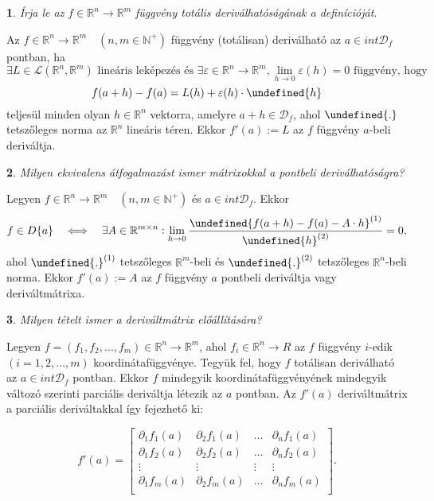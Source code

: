 \documentclass[a4paper]{article}
\def\R{\mathbb{R}}
\def\N{\mathbb{N}}
\theoremstyle{qstyle}
\newtheorem{question}{}{}
\let\norm\undefined %
\DeclarePairedDelimiter\norm{\lVert}{\rVert}
\begin{document}
	\begin{question}
		Írja le az $f \in \R^n \to \R^m$ függvény totális deriválhatóságának a definícióját.
	\end{question}
	Az $f \in \R^n \to \R^m \quad (n,m \in \N^+)$ függvény (totálisan) deriválható az $a\in int\mathcal{D}_f$ pontban, ha
	$$\exists L \in \mathcal{L}(\R^n,\R^m) \text{ lineáris leképezés és } \exists \varepsilon \in \R^n\to\R^m, \lim\limits_{h\to 0} \varepsilon(h) = 0 \text{ függvény, hogy }$$
	$$f(a+h)-f(a) = L(h)+\varepsilon(h) \cdot \norm{h}$$
	teljesül minden olyan $h\in \R^n$ vektorra, amelyre $a+h \in \mathcal{D}_f$, ahol $\norm{ . }$ tetszőleges norma az $\R^n$ lineáris téren. Ekkor $f'(a) := L$ az $f$ függvény $a$-beli deriváltja.
	
	\begin{question}
		Milyen ekvivalens átfogalmazást ismer mátrixokkal a pontbeli deriválhatóságra?
	\end{question}
	Legyen $f \in \R^n\to\R^m \quad (n,m \in \N^+)$ és $a\in int\mathcal{D}_f$. Ekkor
	$$f\in D\{a\} \quad \Longleftrightarrow \quad \exists A \in \R^{m \times n} : \lim\limits_{h\to 0} 
	\frac{\norm{f(a+h)-f(a)-A\cdot h}^{(1)}}{\norm{h}^{(2)}} =0 \text{,}$$
	ahol $\norm{.}^{(1)}$ tetszőleges $\R^m$-beli és $\norm{.}^{(2)}$ tetszőleges $\R^n$-beli norma. Ekkor $f'(a) := A$ az $f$ függvény $a$ pontbeli deriváltja vagy deriváltmátrixa.

	\newpage
	
	\begin{question}
		Milyen tételt ismer a deriváltmátrix előállítására?
	\end{question}
	Legyen $f = (f_{1}, f_{2},\dots,f_{m}) \in \R^{n} \to \R^{m}$, ahol $f_i \in \R^n\to R$ az $f$ függvény $i$-edik $(i=1,2,\dots,m)$ koordinátafüggvénye. Tegyük fel, hogy $f$ totálisan deriválható az $a\in int\mathcal{D}_f$ pontban. Ekkor $f$ mindegyik koordinátafüggvényének mindegyik változó szerinti parciális deriváltja létezik az $a$ pontban. Az $f'(a)$ deriváltmátrix a parciális deriváltakkal így fejezhető ki:
	
	$$f'(a) = \begin{bmatrix} 
	\partial_{1}f_{1}(a) & \partial_{2}f_{1}(a) & \dots & \partial_{n}f_{1}(a) \\
	\partial_{1}f_{2}(a) & \partial_{2}f_{2}(a) & \dots & \partial_{n}f_{2}(a) \\
	\vdots & \vdots &  \vdots &  \vdots  \\
	\partial_{1}f_{m}(a) & \partial_{2}f_{m}(a) & \dots & \partial_{n}f_{m}(a) \\
	\end{bmatrix}\text{.}$$
	
\end{document}
